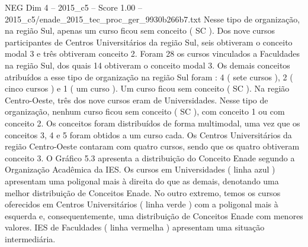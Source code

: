 \begin{textsample}{NEG Dim 4 – 2015\_c5 – Score 1.00 – 2015\_c5/enade\_2015\_tec\_proc\_ger\_9930b266b7.txt}
Nesse tipo de organização, na região Sul, apenas um curso ficou sem conceito ( SC ).
Dos nove cursos participantes de Centros Universitários da região Sul, seis obtiveram o conceito modal 3 e três obtiveram conceito 2.
Foram 28 os cursos vinculados a Faculdades na região Sul, dos quais 14 obtiveram o conceito modal 3.
Os demais conceitos atribuídos a esse tipo de organização na região Sul foram : 4 ( sete cursos ), 2 ( cinco cursos ) e 1 ( um curso ).
Um curso ficou sem conceito ( SC ).
Na região Centro-Oeste, três dos nove cursos eram de Universidades.
Nesse tipo de organização, nenhum curso ficou sem conceito ( SC ), com conceito 1 ou com conceito 2.
Os conceitos foram distribuídos de forma multimodal, uma vez que os conceitos 3, 4 e 5 foram obtidos a um curso cada.
Os Centros Universitários da região Centro-Oeste contaram com quatro cursos, sendo que os quatro obtiveram conceito 3.
O Gráfico 5.3 apresenta a distribuição do Conceito Enade segundo a Organização Acadêmica da IES.
Os cursos em Universidades ( linha azul ) apresentam uma poligonal mais à direita do que as demais, denotando uma melhor distribuição de Conceitos Enade.
No outro extremo, temos os cursos oferecidos em Centros Universitários ( linha verde ) com a poligonal mais à esquerda e, consequentemente, uma distribuição de Conceitos Enade com menores valores.
IES de Faculdades ( linha vermelha ) apresentam uma situação intermediária.

\end{textsample}
